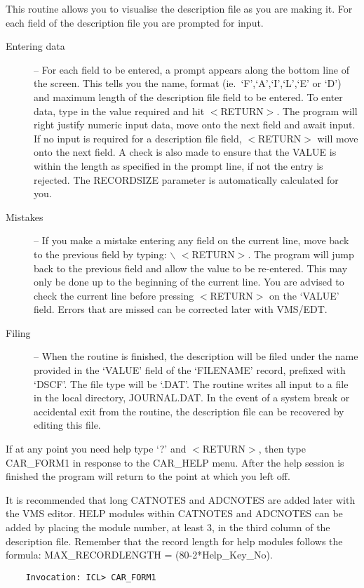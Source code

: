This routine allows you to visualise the description file as you are
making it.
For each field of the description file you are prompted for input.
\begin{description}
\item [Entering data] --
For each field to be entered, a prompt appears along the bottom line of the
screen.
This tells you the name, format (ie.\ `F',`A',`I',`L',`E' or `D') and maximum
length of the description file field to be entered.
To enter data, type in the value required and hit $<$RETURN$>$.
The program will right justify numeric input data, move onto the next field
and await input.
If no input is required for a description file field, $<$RETURN$>$ will move
onto the next field.
A check is also made to ensure that the VALUE is within the length as
specified in the prompt line, if not the entry is rejected.
The RECORDSIZE parameter is automatically calculated for you.
\item [Mistakes] --
If you make a mistake entering any field on the current line, move back to the
previous field by typing: $\backslash$ $<$RETURN$>$.
The program will jump back to the previous field and allow the value to be
re-entered.
This may only be done up to the beginning of the current line.
You are advised to check the current line before pressing $<$RETURN$>$ on the
`VALUE' field.
Errors that are missed can be corrected later with VMS/EDT.
\item [Filing] --
When the routine is finished, the description will be filed under the name
provided in the `VALUE' field of the `FILENAME' record, prefixed with `DSCF'.
The file type will be `.DAT'.
The routine writes all input to a file in the local directory, JOURNAL.DAT.
In the event of a system break or accidental exit from the routine, the
description file can be recovered by editing this file.
\end{description}
If at any point you need help type `?' and $<$RETURN$>$, then type
CAR\_FORM1 in response to the CAR\_HELP menu.
After the help session is finished the program will return to the point
at which you left off.

 It is recommended that long CATNOTES and ADCNOTES are added later
with the VMS editor.
HELP modules within CATNOTES and ADCNOTES can be added by placing the
module number, at least 3, in the third column of the description file.
Remember that the record length for help modules follows the formula:
MAX\_RECORDLENGTH = (80-2*Help\_Key\_No).

\begin{verbatim}
    Invocation: ICL> CAR_FORM1
\end{verbatim}


